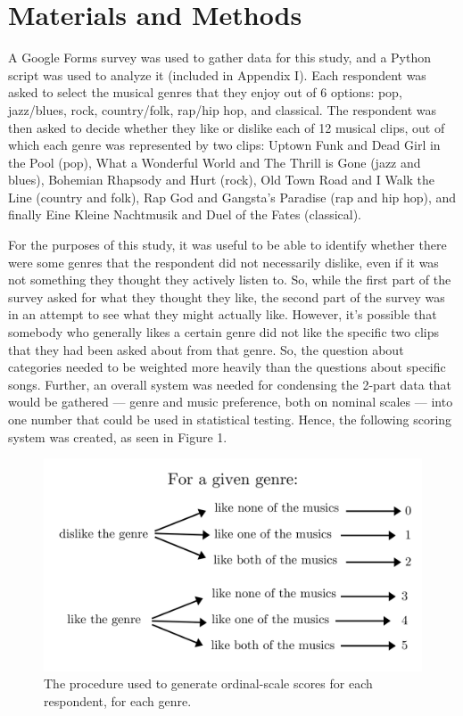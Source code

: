 \documentclass[12pt]{report}
\begin{document}
\chapter*{Materials and Methods}
A Google Forms survey was used to gather data for this study, and a Python script was used to analyze it (included in Appendix I). Each respondent was asked to select the musical genres that they enjoy out of 6 options: pop, jazz/blues, rock, country/folk, rap/hip hop, and classical. The respondent was then asked to decide whether they like or dislike each of 12 musical clips, out of which each genre was represented by two clips: Uptown Funk and Dead Girl in the Pool (pop), What a Wonderful World and The Thrill is Gone (jazz and blues), Bohemian Rhapsody and Hurt (rock), Old Town Road and I Walk the Line (country and folk), Rap God and Gangsta's Paradise (rap and hip hop), and finally Eine Kleine Nachtmusik and Duel of the Fates (classical).

For the purposes of this study, it was useful to be able to identify whether there were some genres that the respondent did not necessarily dislike, even if it was not something they thought they actively listen to. So, while the first part of the survey asked for what they thought they like, the second part of the survey was in an attempt to see what they might actually like. However, it's possible that somebody who generally likes a certain genre did not like the specific two clips that they had been asked about from that genre. So, the question about categories needed to be weighted more heavily than the questions about specific songs. Further, an overall system was needed for condensing the 2-part data that would be gathered --- genre and music preference, both on nominal scales --- into one number that could be used in statistical testing. Hence, the following scoring system was created, as seen in Figure 1.

\begin{figure}[h!]
  \centerline{\includegraphics[width=0.5\linewidth]{matrix.png}}
  \caption{\small The procedure used to generate ordinal-scale scores for each respondent, for each genre.}
\end{figure}
\end{document}
